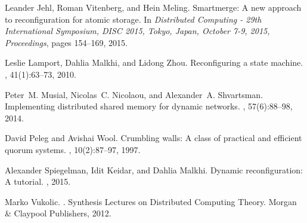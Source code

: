 \documentclass[11pt]{article}
\begin{document}
\begin{thebibliography}{10}
Leander Jehl, Roman Vitenberg, and Hein Meling.
\newblock Smartmerge: {A} new approach to reconfiguration for atomic storage.
\newblock In {\em Distributed Computing - 29th International Symposium, {DISC}
  2015, Tokyo, Japan, October 7-9, 2015, Proceedings}, pages 154--169, 2015.

Leslie Lamport, Dahlia Malkhi, and Lidong Zhou.
\newblock Reconfiguring a state machine.
, 41(1):63--73, 2010.

Peter~M. Musial, Nicolas~C. Nicolaou, and Alexander~A. Shvartsman.
\newblock Implementing distributed shared memory for dynamic networks.
, 57(6):88--98, 2014.

David Peleg and Avishai Wool.
\newblock Crumbling walls: {A} class of practical and efficient quorum systems.
, 10(2):87--97, 1997.

Alexander Spiegelman, Idit Keidar, and Dahlia Malkhi.
\newblock Dynamic reconfiguration: A tutorial.
, 2015.

Marko Vukolic.
.
\newblock Synthesis Lectures on Distributed Computing Theory. Morgan {\&}
  Claypool Publishers, 2012.

\end{thebibliography}

\clearpage
\end{document}
